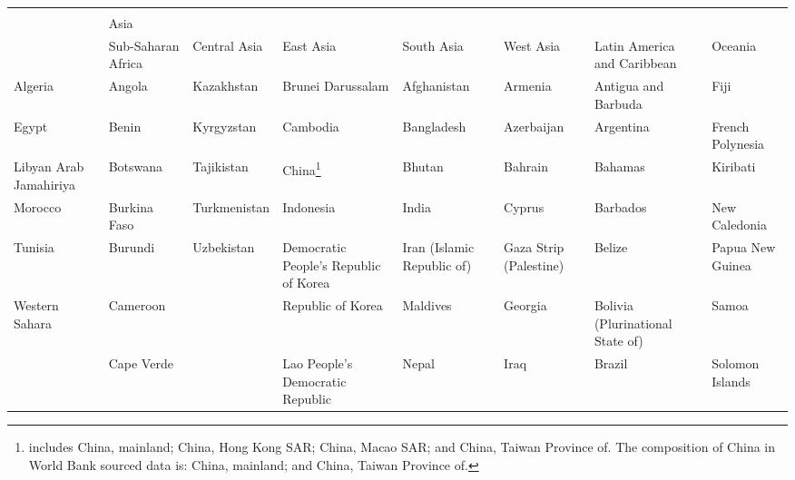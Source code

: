 \begin{longtable}{p{1.6cm}p{2cm}p{1.3cm}p{2.8cm}p{1.5cm}p{2.2cm}p{3cm}p{2cm}}
  \toprule
 \rowcolor{@tableheadcolor}\multicolumn{8}{H}{\color{white}Developing regions}\\
 \hhline{%
>{\arrayrulecolor{white}}--------%
}
 \rowcolor{@tableheadcolor} \multicolumn{2}{H}{\color{white}Africa}&\multicolumn{4}{H}{\color{white}Asia}&\multicolumn{1}{P{3cm}}{\color{white}}&\multicolumn{1}{H}{\color{white}} \\
 \hhline{%
	>{\arrayrulecolor{white}}--%
	>{\arrayrulecolor{@tableheadcolor}}|>{\arrayrulecolor{white}}----%
	>{\arrayrulecolor{@tableheadcolor}}|>{\arrayrulecolor{white}}-%
	>{\arrayrulecolor{@tableheadcolor}}|>{\arrayrulecolor{white}}-%
}
 \rowcolor{@tableheadcolor} \multicolumn{1}{H}{\color{white}North Africa}&\multicolumn{1}{H}{\color{white}Sub-Saharan Africa}&\multicolumn{1}{H}{\color{white}Central Asia}&\multicolumn{1}{H}{\color{white}East Asia}&\multicolumn{1}{H}{\color{white}South Asia}&\multicolumn{1}{H}{\color{white}West Asia}&\multicolumn{1}{H}{\color{white}Latin America and Caribbean}&\multicolumn{1}{H}{\color{white}Oceania} \\
 \midrule
\endhead
 Algeria & Angola & Kazakhstan & Brunei Darussalam & Afghanistan & Armenia & Antigua and Barbuda & Fiji \\ 
  Egypt & Benin & Kyrgyzstan & Cambodia & Bangladesh & Azerbaijan & Argentina & French Polynesia \\ 
  Libyan Arab Jamahiriya & Botswana & Tajikistan & China\footnote{includes China, mainland; China, Hong Kong SAR; China, Macao SAR; and China, Taiwan Province of. The composition of China in World Bank sourced data is:  China, mainland; and China, Taiwan Province of.} & Bhutan & Bahrain & Bahamas & Kiribati \\ 
  Morocco & Burkina Faso & Turkmenistan & Indonesia & India & Cyprus & Barbados & New Caledonia \\ 
  Tunisia & Burundi & Uzbekistan & Democratic People's Republic of Korea & Iran (Islamic Republic of) & Gaza Strip (Palestine) & Belize & Papua New Guinea \\ 
  Western Sahara & Cameroon &  & Republic of Korea & Maldives & Georgia & Bolivia (Plurinational State of) & Samoa \\ 
   & Cape Verde &  & Lao People's Democratic Republic & Nepal & Iraq & Brazil & Solomon Islands \\ 

\end{longtable}
